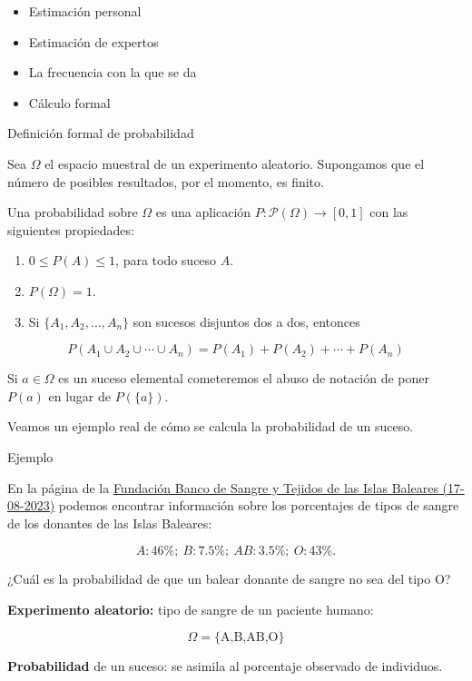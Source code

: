 \documentclass[
  letterpaper,
  DIV=11,
  numbers=noendperiod]{scrreprt}
\providecommand{\tightlist}{%
  \setlength{\itemsep}{0pt}\setlength{\parskip}{0pt}}\usepackage{longtable,booktabs,array}
\begin{document}
\begin{itemize}
\item
  Estimación personal
\item
  Estimación de expertos
\item
  La frecuencia con la que se da
\item
  Cálculo formal
\end{itemize}

Definición formal de probabilidad

Sea \(\Omega\) el espacio muestral de un experimento aleatorio.
Supongamos que el número de posibles resultados, por el momento, es
finito.

Una probabilidad sobre \(\Omega\) es una aplicación
\(P:\mathcal{P}(\Omega)\to [0,1]\) con las siguientes propiedades:

\begin{enumerate}
\def\labelenumi{\arabic{enumi}.}
\tightlist
\item
  \(0\leq P(A)\leq 1\), para todo suceso \(A\).
\item
  \(P(\Omega)=1\).
\item
  Si \(\{A_1,A_2,\ldots,A_n\}\) son sucesos disjuntos dos a dos,
  entonces
\end{enumerate}

\[
P(A_1\cup A_2\cup \cdots \cup A_n)=P(A_1)+P(A_2)+\cdots +P(A_n)
\]

Si \(a\in \Omega\) es un suceso elemental cometeremos el abuso de
notación de poner \(P(a)\) en lugar de \(P(\{a\})\).

Veamos un ejemplo real de cómo se calcula la probabilidad de un suceso.

Ejemplo

En la página de la
\href{http://www.donasang.org/que-es-la-sang/es_frequencies-dels-diferents-grups.html}{Fundación
Banco de Sangre y Tejidos de las Islas Baleares (17-08-2023)} podemos
encontrar información sobre los porcentajes de tipos de sangre de los
donantes de las Islas Baleares:

\[A: 46\%;\  B: 7.5\%;\  AB: 3.5\%;\  O: 43\%.\]

¿Cuál es la probabilidad de que un balear donante de sangre no sea del
tipo O?

\textbf{Experimento aleatorio:} tipo de sangre de un paciente humano:

\[\Omega=\{\mbox{A,B,AB,O}\}\]

\textbf{Probabilidad} de un suceso: se asimila al porcentaje observado
de individuos.
\end{document}
